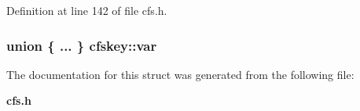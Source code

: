 Definition at line 142 of file cfs.h.
\subsubsection{\setlength{\rightskip}{0pt plus 5cm}union \{ ... \}   {\bf cfskey::var}}\label{structcfskey_o21}




The documentation for this struct was generated from the following file:\begin{CompactItemize}
\item 
{\bf cfs.h}\end{CompactItemize}
